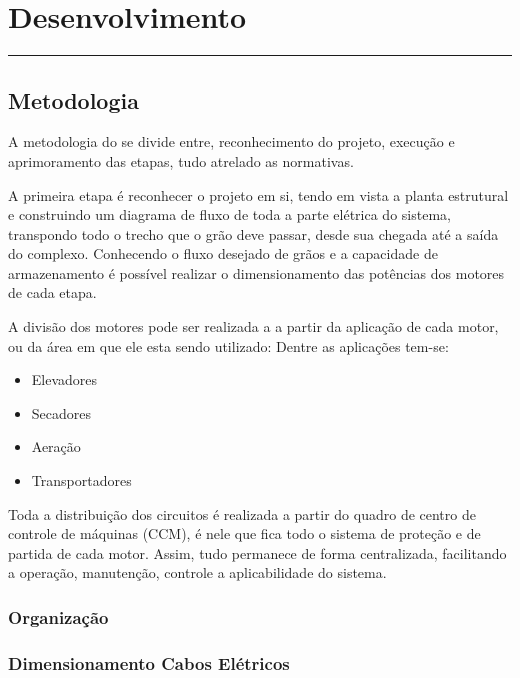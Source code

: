 \chapter{Desenvolvimento}\label{chp:desenvol}
\vspace{-1.5cm}
\noindent\rule{\columnwidth}{1.2mm}



\section{Metodologia}

A metodologia do se divide entre, reconhecimento do projeto, execução e aprimoramento das etapas, tudo atrelado as normativas.

A primeira etapa é reconhecer o projeto em si, tendo em vista a planta estrutural e construindo um diagrama de fluxo de toda a parte elétrica do sistema, transpondo todo o trecho que o grão deve passar, desde sua chegada até a saída do complexo. Conhecendo o fluxo desejado de grãos e a capacidade de armazenamento é possível realizar o dimensionamento das potências dos motores de cada etapa. 

A divisão dos motores pode ser realizada a a partir da aplicação de cada motor, ou da área em que ele esta sendo utilizado:
Dentre as aplicações tem-se:

\begin{itemize}
    \item Elevadores
    \item Secadores
    \item Aeração
    \item Transportadores
\end{itemize}

Toda  a distribuição dos circuitos é realizada a partir do quadro de centro de controle de máquinas (CCM), é nele que fica todo o sistema de proteção e de partida de cada motor. Assim, tudo permanece de forma centralizada, facilitando a operação, manutenção, controle a aplicabilidade do sistema.

\subsection{Organização}


\subsection{Dimensionamento Cabos Elétricos}

